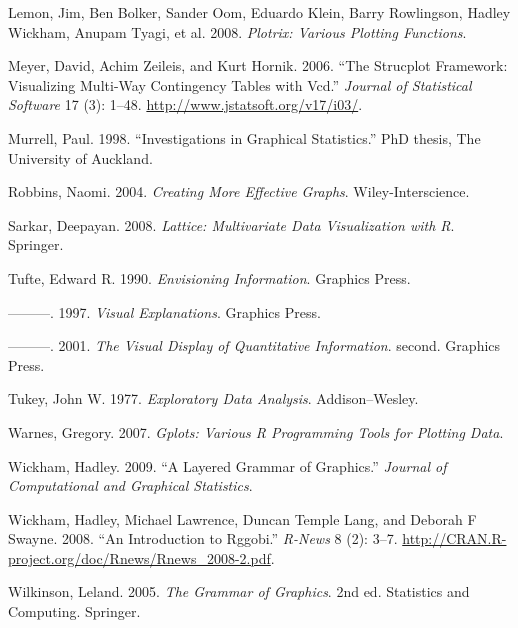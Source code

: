 Lemon, Jim, Ben Bolker, Sander Oom, Eduardo Klein, Barry Rowlingson,
Hadley Wickham, Anupam Tyagi, et al. 2008. \emph{Plotrix: Various
Plotting Functions}.

Meyer, David, Achim Zeileis, and Kurt Hornik. 2006. ``The Strucplot
Framework: Visualizing Multi-Way Contingency Tables with Vcd.''
\emph{Journal of Statistical Software} 17 (3): 1--48.
\url{http://www.jstatsoft.org/v17/i03/}.

Murrell, Paul. 1998. ``Investigations in Graphical Statistics.''
PhD thesis, The University of Auckland.

Robbins, Naomi. 2004. \emph{Creating More Effective Graphs}.
Wiley-Interscience.

Sarkar, Deepayan. 2008. \emph{Lattice: Multivariate Data Visualization
with R}. Springer.

Tufte, Edward R. 1990. \emph{Envisioning Information}. Graphics Press.

---------. 1997. \emph{Visual Explanations}. Graphics Press.

---------. 2001. \emph{The Visual Display of Quantitative Information}.
second. Graphics Press.

Tukey, John W. 1977. \emph{Exploratory Data Analysis}. Addison--Wesley.

Warnes, Gregory. 2007. \emph{Gplots: Various R Programming Tools for
Plotting Data}.

Wickham, Hadley. 2009. ``A Layered Grammar of Graphics.'' \emph{Journal
of Computational and Graphical Statistics}.

Wickham, Hadley, Michael Lawrence, Duncan {Temple Lang}, and Deborah F
Swayne. 2008. ``An Introduction to Rggobi.'' \emph{R-News} 8 (2): 3--7.
\url{http://CRAN.R-project.org/doc/Rnews/Rnews_2008-2.pdf}.

Wilkinson, Leland. 2005. \emph{The Grammar of Graphics}. 2nd ed.
Statistics and Computing. Springer.
